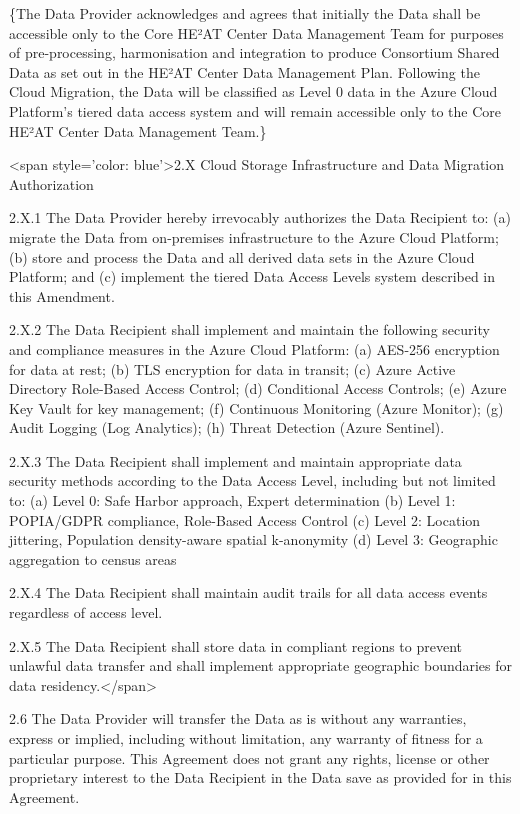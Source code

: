 \documentclass[12pt,letterpaper]{article}
\newcommand{\added}[1]{\textcolor{addcolor}{#1}}
\begin{document}
\added\{The Data Provider acknowledges and agrees that initially the Data shall be accessible only to the Core HE²AT Center Data Management Team for purposes of pre-processing, harmonisation and integration to produce Consortium Shared Data as set out in the HE²AT Center Data Management Plan. Following the Cloud Migration, the Data will be classified as Level 0 data in the Azure Cloud Platform's tiered data access system and will remain accessible only to the Core HE²AT Center Data Management Team.\}

<span style='color: blue'>2.X Cloud Storage Infrastructure and Data Migration Authorization

2.X.1 The Data Provider hereby irrevocably authorizes the Data Recipient to: (a) migrate the Data from on-premises infrastructure to the Azure Cloud Platform; (b) store and process the Data and all derived data sets in the Azure Cloud Platform; and (c) implement the tiered Data Access Levels system described in this Amendment.

2.X.2 The Data Recipient shall implement and maintain the following security and compliance measures in the Azure Cloud Platform: (a) AES-256 encryption for data at rest; (b) TLS encryption for data in transit; (c) Azure Active Directory Role-Based Access Control; (d) Conditional Access Controls; (e) Azure Key Vault for key management; (f) Continuous Monitoring (Azure Monitor); (g) Audit Logging (Log Analytics); (h) Threat Detection (Azure Sentinel).

2.X.3 The Data Recipient shall implement and maintain appropriate data security methods according to the Data Access Level, including but not limited to: (a) Level 0: Safe Harbor approach, Expert determination (b) Level 1: POPIA/GDPR compliance, Role-Based Access Control (c) Level 2: Location jittering, Population density-aware spatial k-anonymity (d) Level 3: Geographic aggregation to census areas

2.X.4 The Data Recipient shall maintain audit trails for all data access events regardless of access level.

2.X.5 The Data Recipient shall store data in compliant regions to prevent unlawful data transfer and shall implement appropriate geographic boundaries for data residency.</span>

2.6	The Data Provider will transfer the Data as is without any warranties, express or implied, including without limitation, any warranty of fitness for a particular purpose. This Agreement does not grant any rights, license or other proprietary interest to the Data Recipient in the Data save as provided for in this Agreement. 
\end{document}
